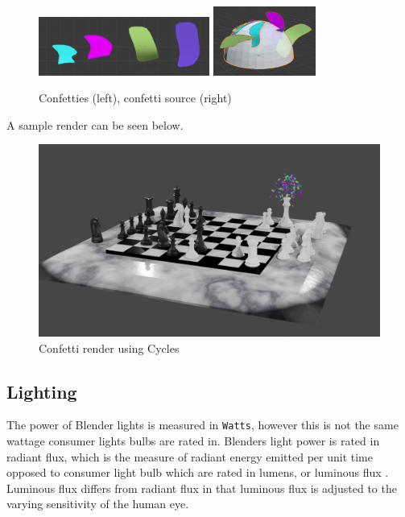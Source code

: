 \documentclass[11pt]{article}
\begin{document}
\begin{figure}[htbp]
\begin{center}
\includegraphics[width=0.5\textwidth]{Images/confetties.png}
\includegraphics[width=0.3\textwidth]{Images/confetti dome.png}
\end{center}
\caption{Confetties (left), confetti source (right)}
\end{figure}

A sample render can be seen below.
\begin{figure}[htbp]
\centering
\includegraphics[width=\textwidth]{Images/Confetti! cycles.png}
\caption{Confetti render using Cycles}
\end{figure}
\newpage
\subsection{Lighting}
\label{sec:orgadc1a7c}
The power of Blender lights is measured in \texttt{Watts}, however this is not the same
wattage consumer lights bulbs are rated in. Blenders light power is rated
in radiant flux, which is the measure of radiant energy emitted per unit time
opposed to consumer light bulb which are rated in lumens, or luminous flux
\cite{radiant-flux,luminous-flux}. Luminous flux differs from radiant flux in that
luminous flux is adjusted to the varying sensitivity of the human eye.
\cite{luminous-flux}
\end{document}

